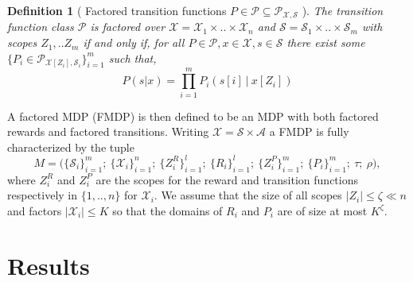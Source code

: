 \documentclass{article}
\newtheorem{mydef}{Definition}
\newcommand{\Xc}{\mathcal{X}}
\newcommand{\Pc}{\mathcal{P}}
\newcommand{\Sc}{\mathcal{S}}
\newcommand{\Ac}{\mathcal{A}}
\begin{document}
\begin{mydef}[ Factored transition functions $P \in \Pc \subseteq \Pc_{\Xc,\Sc}$ ]
\hspace{0.000000001mm} \newline
The transition function class $\Pc$ is factored over $\Xc = \Xc_1 \times .. \times \Xc_n$ and $\Sc = \Sc_1 \times .. \times \Sc_m$ with scopes  $Z_1, .. Z_m$ if and only if, 
for all $P \in \Pc, x \in \Xc, s \in \Sc$ there exist some $\{P_i \in \Pc_{\Xc[Z_i],\Sc_i}\}_{i=1}^m$ such that,
$$ P(s | x) = \prod_{i=1}^m P_i \left( s[i] \ \bigg\vert \ x[Z_i] \right) $$
\end{mydef}

A factored MDP (FMDP) is then defined to be an MDP with both factored rewards and factored transitions.
Writing $\Xc = \Sc \times \Ac$ a FMDP is fully characterized by the tuple
$$ M = \big( \{ \Sc_i \}_{i=1}^m ; \  \{ \Xc_i \}_{i=1}^n ; \   \{ Z^R_i \}_{i=1}^l;\  \{ R_i \}_{i=1}^l;\  \{ Z^P_i \}_{i=1}^m;\  \{ P_i \}_{i=1}^m;\  \tau;\  \rho  \big), $$
where $Z^R_i$ and $Z^P_i$ are the scopes for the reward and transition functions respectively in $\{1,..,n \}$ for $\Xc_i$.
We assume that the size of all scopes $| Z_i | \le \zeta \ll n$ and factors $|\Xc_i| \le K$ so that the domains of $R_i$ and $P_i$ are of size at most $K^\zeta$.





\section{Results}

\end{document}
